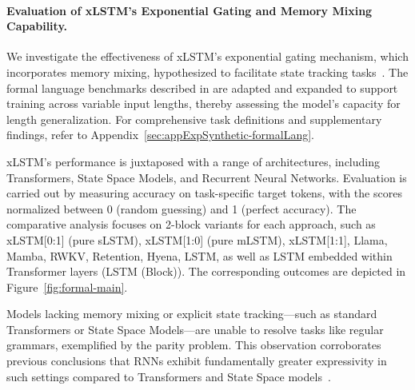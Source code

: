 \paragraph{Evaluation of xLSTM's Exponential Gating and Memory Mixing Capability.} We investigate the effectiveness of xLSTM's exponential gating mechanism, which incorporates memory mixing, hypothesized to facilitate state tracking tasks~\citep{Merrill:24, Merrill:23}. The formal language benchmarks described in \citet{Deletang:23} are adapted and expanded to support training across variable input lengths, thereby assessing the model's capacity for length generalization. For comprehensive task definitions and supplementary findings, refer to Appendix~\ref{sec:appExpSynthetic-formalLang}. 

xLSTM's performance is juxtaposed with a range of architectures, including Transformers, State Space Models, and Recurrent Neural Networks. Evaluation is carried out by measuring accuracy on task-specific target tokens, with the scores normalized between 0 (random guessing) and 1 (perfect accuracy). The comparative analysis focuses on 2-block variants for each approach, such as xLSTM[0:1] (pure sLSTM), xLSTM[1:0] (pure mLSTM), xLSTM[1:1], Llama, Mamba, RWKV, Retention, Hyena, LSTM, as well as LSTM embedded within Transformer layers (LSTM (Block)). The corresponding outcomes are depicted in Figure~\ref{fig:formal-main}.

Models lacking memory mixing or explicit state tracking—such as standard Transformers or State Space Models—are unable to resolve tasks like regular grammars, exemplified by the parity problem. This observation corroborates previous conclusions that RNNs exhibit fundamentally greater expressivity in such settings compared to Transformers and State Space models~\citep{Merrill:24, Merrill:23, Deletang:23}.

